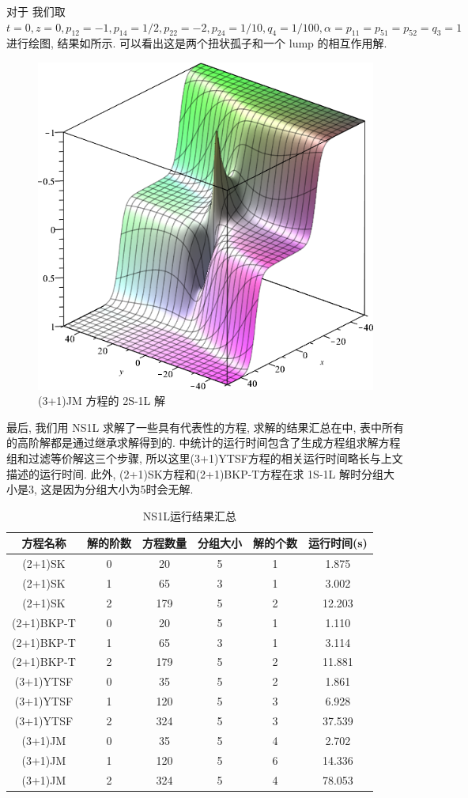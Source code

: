 对于 我们取 $t=0,z=0,p_{12}=-1,p_{14}=1/2,p_{22}=-2,p_{24}=1/10,q_4=1/100,\alpha=p_{11}=p_{51}=p_{52}=q_3=1$进行绘图, 结果如所示. 可以看出这是两个扭状孤子和一个 lump 的相互作用解.


\begin{figure}[H]
\centering
\includegraphics[width=.55\textwidth]{fig/2S1L.png}
\caption{(3+1)JM 方程的 2S-1L 解} \label{fig-2S1L}
\end{figure}

最后, 我们用 NS1L 求解了一些具有代表性的方程, 求解的结果汇总在中, 表中所有的高阶解都是通过继承求解得到的. 中统计的运行时间包含了生成方程组\D 求解方程组和过滤等价解这三个步骤, 所以这里(3+1)YTSF方程的相关运行时间略长与上文描述的运行时间. 此外, (2+1)SK方程和(2+1)BKP-T方程在求 1S-1L 解时分组大小是3, 这是因为分组大小为5时会无解.

\begin{table}[htbp]
\centering
\caption{NS1L运行结果汇总} \label{NS1L-tb}
\begin{tabular}{cccccc}
\hline
方程名称    & 解的阶数 & 方程数量 & 分组大小 & 解的个数 & 运行时间(s) \\ 
\hline 
(2+1)SK & 0 & 20 & 5 & 1 & 1.875 \\
(2+1)SK & 1 & 65 & 3 & 1 & 3.002 \\
(2+1)SK & 2 & 179 & 5 & 2 & 12.203 \\
(2+1)BKP-T & 0 & 20 & 5 & 1 & 1.110 \\
(2+1)BKP-T & 1 & 65 & 3 & 1 & 3.114 \\
(2+1)BKP-T & 2 & 179 & 5 & 2 & 11.881 \\
(3+1)YTSF & 0 & 35 & 5 & 2 & 1.861 \\
(3+1)YTSF & 1 & 120 & 5 & 3 & 6.928 \\
(3+1)YTSF & 2 & 324 & 5 & 3 & 37.539 \\
(3+1)JM & 0 & 35 & 5 & 4 & 2.702 \\
(3+1)JM & 1 & 120 & 5 & 6 & 14.336 \\
(3+1)JM & 2 & 324 & 5 & 4 & 78.053 \\
\hline 
\end{tabular}
\end{table}

